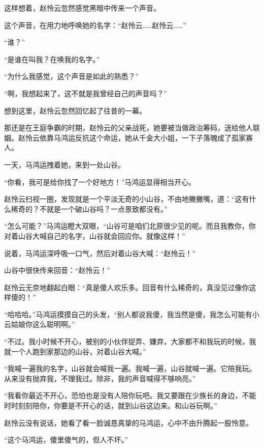 
\begin{this_body}

这样想着，赵怜云忽然感觉黑暗中传来一个声音。

这个声音，在用力地呼唤她的名字：“赵怜云……赵怜云……”

“谁？”

“是谁在叫我？在唤我的名字。”

“为什么我感觉，这个声音是如此的熟悉？”

“啊，我想起来了，这不就是我曾经自己的声音吗？”

想到这里，赵怜云忽然回忆起了往昔的一幕。

那还是在王庭争霸的时期，赵怜云的父亲战死，她要被当做政治筹码，送给他人联姻。赵怜云依靠马鸿运反抗这个命运，她从千金大小姐，一下子落魄成了孤家寡人。

一天，马鸿运拽着她，来到一处山谷。

“你看，我可是给你找了一个好地方！”马鸿运显得相当开心。

赵怜云扫视一圈，发现就是一个平淡无奇的小山谷，不由地撇撇嘴，道：“这有什么稀奇的？不就是一个破山谷吗？一点景致都没有。”

“怎么可能？”马鸿运瞪大双眼，“山谷可是咱们北原很少见的呢。而且我教你，你对着山谷大喊自己的名字，山谷就会回应你。就像这样！”

说着，马鸿运深呼吸一口气，然后对着山谷大喊：“赵怜云！”

山谷中很快传来回音：“赵怜云！”

赵怜云无奈地翻起白眼：“真是傻人欢乐多。回音有什么稀奇的，真没见过像你这样傻的！”

“哈哈哈。”马鸿运摸摸自己的头发，“别人都说我傻，我当然是傻，我怎么可能有小云姑娘你这么聪明啊。”

“不过。我小时候不开心，被别的小伙伴捉弄、嫌弃，大家都不和我玩的时候，我就一个人跑到家那边的山谷，对着山谷大喊。”

“我喊一遍我的名字，山谷就会喊我一遍。我喊一遍，山谷就喊一遍。它陪我玩。从来没有抛弃我，不理我过。除非，我的声音喊得不够响亮。”

“我看你最近不开心，恐怕也是没有人陪你玩吧。我又要跟在少族长的身边，不能时时刻刻陪你，你要是不开心的话，就到山谷这边来。和山谷玩啊。”

赵怜云没有说话，她看了看一脸诚恳真挚的马鸿运，心中不由升腾起一股怜意。

“这个马鸿运，傻里傻气的，但人不坏。”


\end{this_body}
